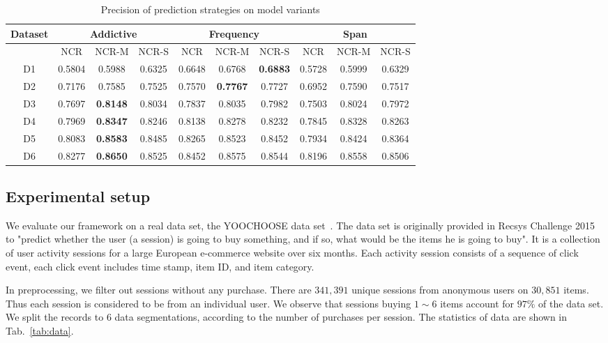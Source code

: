 \documentclass[sigconf]{acmart}
\begin{document}
\begin{table*}[htbp]
\caption{Precision of prediction strategies on model variants }
\label{tab:strategy}
\begin{tabular}{|c|c|c|c|c|c|c|c|c|c|}
\hline
Dataset & \multicolumn{3}{|c|}{Addictive} &  \multicolumn{3}{|c|}{Frequency} & \multicolumn{3}{|c|}{Span} \\\hline
  & NCR & NCR-M & NCR-S  & NCR & NCR-M & NCR-S  & NCR & NCR-M & NCR-S \\\hline
D1 & 0.5804	& 0.5988	& 0.6325& 	0.6648& 	0.6768& 	\bf{0.6883}& 	0.5728	& 0.5999	& 0.6329 \\\hline
D2& 0.7176	& 0.7585	& 0.7525	& 0.7570	& \bf{0.7767}	& 0.7727	& 0.6952	& 0.7590& 	0.7517	\\\hline
D3& 0.7697	& \bf{0.8148}	& 0.8034	& 0.7837& 	0.8035	& 0.7982	& 0.7503	& 0.8024& 	0.7972	\\\hline
D4& 0.7969& 	\bf{0.8347}	& 0.8246	& 0.8138	& 0.8278	& 0.8232& 	0.7845	& 0.8328	& 0.8263\\\hline
D5& 0.8083	& \bf{0.8583}& 	0.8485& 	0.8265& 	0.8523& 	0.8452	& 0.7934 &	0.8424& 	0.8364\\\hline
D6& 0.8277	& \bf{0.8650}	& 0.8525	& 0.8452& 	0.8575& 	0.8544& 	0.8196	& 0.8558	& 0.8506	\\ \hline 
\end{tabular}
\end{table*}

\subsection{Experimental setup}

We evaluate our framework on a real data set, the YOOCHOOSE data set~\cite{Ben-Shimon2015RecSys}. The data set is originally provided in Recsys Challenge 2015 to "predict whether the user (a session) is going to buy something, and if so, what would be the items he is going to buy". It is a collection of user activity sessions for a large
European e-commerce website over six months. Each activity session consists of a sequence of click event, each click event includes time stamp, item ID, and item category. 

In preprocessing, we filter out sessions without any purchase. There are $341,391$ unique sessions from anonymous users on $30,851$ items.  Thus each session is considered to be from an individual user.  We observe that sessions buying $1\sim 6$ items account for $97\%$ of the data set. We split the records to 6 data segmentations, according to the number of purchases per session. The statistics of data are shown in Tab.~\ref{tab:data}. %
    
\end{document}
